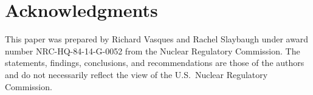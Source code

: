 \documentclass{anstrans}
\begin{document}
\section{Acknowledgments}
This paper was prepared by Richard Vasques and Rachel Slaybaugh under award number NRC-HQ-84-14-G-0052 from the Nuclear Regulatory Commission. The statements, findings, conclusions, and recommendations are those of the authors and do not necessarily reflect the view of the U.S.\ Nuclear Regulatory Commission.



\end{document}
